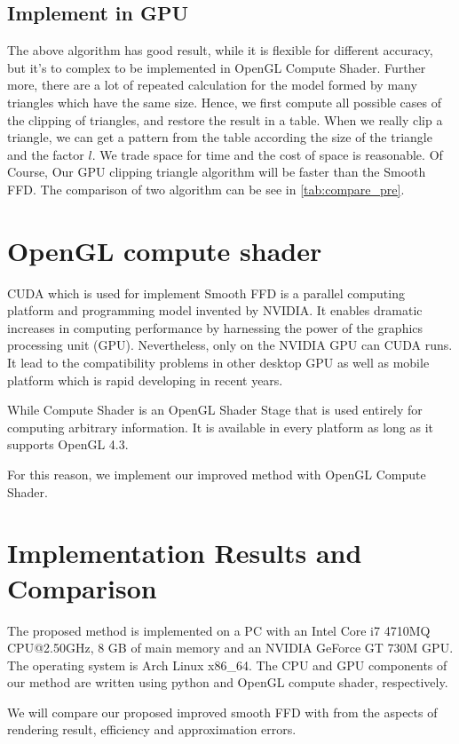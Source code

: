 \documentclass[3p]{elsarticle}
\begin{document}
\subsection{Implement in GPU}
The above algorithm has good result, while it is flexible for different accuracy, but it's to complex to be implemented in OpenGL Compute Shader. Further more, there are a lot of repeated calculation for the model formed by many triangles which have the same size.
Hence, we first compute all possible cases of the clipping of triangles, and restore the result in a table. When we really clip a triangle, we can get a pattern from the table according the size of the triangle and the factor $l$. We trade space for time and the cost of space is reasonable. Of Course, Our GPU clipping triangle algorithm will be faster than the Smooth FFD. The comparison of two algorithm can be see in \ref{tab:compare_pre}.

\section{OpenGL compute shader}
CUDA which is used for implement Smooth FFD is a parallel computing platform and programming model invented by NVIDIA. It enables dramatic increases in computing performance by harnessing the power of the graphics processing unit (GPU). Nevertheless, only on the NVIDIA GPU can CUDA runs. It lead to the compatibility problems in other desktop GPU as well as mobile platform which is rapid developing in recent years.

While Compute Shader is an OpenGL Shader Stage that is used entirely for computing arbitrary information. It is available in every platform as long as it supports OpenGL 4.3.

For this reason, we implement our improved method with OpenGL Compute Shader.

\section{Implementation Results and Comparison}

The proposed method is implemented on a PC with an Intel Core i7 4710MQ CPU@2.50GHz, 8 GB of main memory and an NVIDIA GeForce GT 730M GPU. The operating system is Arch Linux x86\_64. The CPU and GPU components of our method are written using python and OpenGL compute shader, respectively.

We will compare our proposed improved smooth FFD with \cite{Cui15} from the aspects of rendering result, efficiency and approximation errors.
\end{document}
